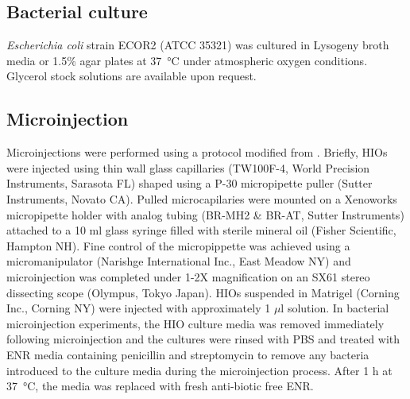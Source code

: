 \documentclass[9pt,lineo]{elife}
\begin{document}
\subsection*{{\bfseries\sffamily } Bacterial culture}
\label{sec:orgheadline14}
\emph{Escherichia coli} strain ECOR2 (ATCC 35321) was cultured in Lysogeny broth media or 1.5\% agar plates at \SI{37}{\celsius} under atmospheric oxygen conditions. Glycerol stock solutions are available upon request. 
\subsection*{{\bfseries\sffamily } Microinjection}
\label{sec:orgheadline15}
Microinjections were performed using a protocol modified from \citet{Leslie:2015}. Briefly, HIOs were injected using thin wall glass capillaries (TW100F-4, World Precision Instruments, Sarasota FL) shaped using a P-30 micropipette puller (Sutter Instruments, Novato CA). Pulled microcapilaries were mounted on a Xenoworks micropipette holder with analog tubing (BR-MH2 \& BR-AT, Sutter Instruments) attached to a 10 ml glass syringe filled with sterile mineral oil (Fisher Scientific, Hampton NH). Fine control of the micropippette was achieved using a micromanipulator (Narishge International Inc., East Meadow NY) and microinjection was completed under 1-2X magnification on an SX61 stereo dissecting scope (Olympus, Tokyo Japan). HIOs suspended in Matrigel (Corning Inc., Corning NY) were injected with approximately 1 \(\mu\)l solution. In bacterial microinjection experiments, the HIO culture media was removed immediately following microinjection and the cultures were rinsed with PBS and treated with ENR media containing penicillin and streptomycin to remove any bacteria introduced to the culture media during the microinjection process. After 1 h at \SI{37}{\celsius}, the media was replaced with fresh anti-biotic free ENR.
\end{document}
